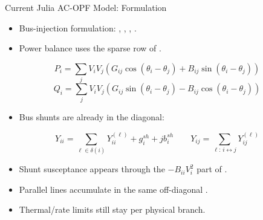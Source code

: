 \begin{frame}{Current Julia AC-OPF Model: Formulation}
\small
\begin{itemize}
  \item Bus-injection formulation: , , , .
  \item Power balance uses the sparse row of .
\end{itemize}

\[
P_i =
\sum_j V_iV_j\left(G_{ij}\cos(\theta_i-\theta_j)+B_{ij}\sin(\theta_i-\theta_j)\right)
\]
\[
Q_i =
\sum_j V_iV_j\left(G_{ij}\sin(\theta_i-\theta_j)-B_{ij}\cos(\theta_i-\theta_j)\right)
\]

\begin{itemize}
  \item Bus shunts are already in the diagonal:
\end{itemize}
\[
Y_{ii} = \sum_{\ell \in \delta(i)} Y_{ii}^{(\ell)} + g_i^{sh} + j b_i^{sh}
\qquad
Y_{ij} = \sum_{\ell:\, i \leftrightarrow j} Y_{ij}^{(\ell)}
\]

\begin{itemize}
  \item Shunt susceptance appears through the \(-B_{ii}V_i^2\) part of .
  \item Parallel lines accumulate in the same off-diagonal .
  \item Thermal/rate limits still stay per physical branch.
\end{itemize}

\vspace{0.2em}

\end{frame}



